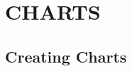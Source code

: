 \documentclass[11pt, oneside]{article}   	%
\begin{document}
\section{CHARTS}
\subsection{ Creating Charts}

\end{document}
